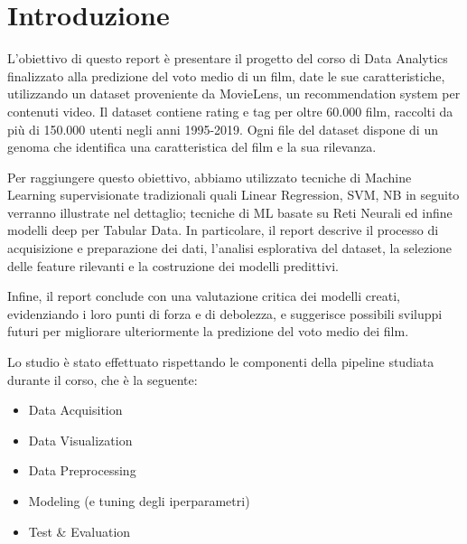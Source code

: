 \documentclass[../../Report.tex]{subfiles}
\begin{document}
\chapter{Introduzione}
L'obiettivo di questo report è presentare il progetto del corso di Data Analytics finalizzato alla predizione del voto medio di un film, date le sue caratteristiche, utilizzando un dataset proveniente da MovieLens, un recommendation system per contenuti video.
Il dataset contiene rating e tag per oltre 60.000 film, raccolti da più di 150.000 utenti negli anni 1995-2019. Ogni file del dataset dispone di un genoma che identifica una caratteristica del film e la sua rilevanza.

Per raggiungere questo obiettivo, abbiamo utilizzato tecniche di Machine Learning supervisionate tradizionali quali Linear Regression, SVM, NB in seguito verranno illustrate nel dettaglio; tecniche di ML basate su Reti Neurali ed infine modelli deep per Tabular Data.
In particolare, il report descrive il processo di acquisizione e preparazione dei dati, l'analisi esplorativa del dataset, la selezione delle feature rilevanti e la costruzione dei modelli predittivi.

Infine, il report conclude con una valutazione critica dei modelli creati, evidenziando i loro punti di forza e di debolezza, e suggerisce possibili sviluppi futuri per migliorare ulteriormente la predizione del voto medio dei film.

Lo studio è stato effettuato rispettando le componenti della pipeline studiata durante il corso, che è la seguente:
\begin{itemize}
    \item Data Acquisition
    \item Data Visualization
    \item Data Preprocessing
    \item Modeling (e tuning degli iperparametri)
    \item Test \& Evaluation
\end{itemize}
\end{document}
